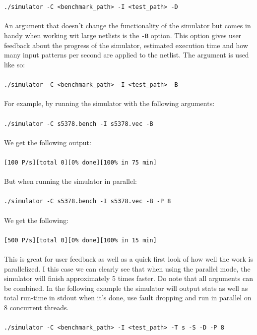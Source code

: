 \documentclass[a4paper,12pt]{article}
\begin{document}
\\\\ \texttt{./simulator -C <benchmark\_path> -I <test\_path> -D} \\\\
\clearpage
An argument that doesn't change the functionality of the simulator but comes in handy when working wit large netlists is the \texttt{-B} option. This option gives user feedback about the progress of the simulator, estimated execution time and how many input patterns per second are applied to the netlist. The argument is used like so: 
\\\\ \texttt{./simulator -C <benchmark\_path> -I <test\_path> -B} \\\\
For example, by running the simulator with the following arguments:
\\\\ \texttt{./simulator -C s5378.bench -I s5378.vec -B} \\\\
We get the following output:
\\\\ \texttt{[100 P/s][total 0][0\% done][100\% in 75 min]} \\\\
But when running the simulator in parallel:
\\\\ \texttt{./simulator -C s5378.bench -I s5378.vec -B -P 8} \\\\
We get the following:
\\\\\texttt{[500 P/s][total 0][0\% done][100\% in 15 min]}\\\\
This is great for user feedback as well as a quick first look of how well the work is parallelized. I this case we can clearly see that when using the parallel mode, the simulator will finish approximately 5 times faster. Do note that all arguments can be combined. In the following example the simulator will output stats as well as total run-time in stdout when it's done, use fault dropping and run in parallel on 8 concurrent threads.
\\\\ \texttt{./simulator -C <benchmark\_path> -I <test\_path> -T s -S -D -P 8} \\\\

\clearpage 
\end{document}
